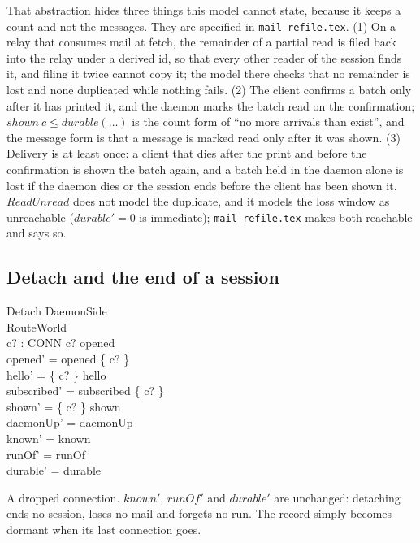 \documentclass[a4paper,10pt,fleqn]{article}
\begin{document}
That abstraction hides three things this model cannot state, because it keeps
a count and not the messages.  They are specified in \texttt{mail-refile.tex}.
(1) On a relay that consumes mail at fetch, the remainder of a partial read is
filed back into the relay under a derived id, so that every other reader of
the session finds it, and filing it twice cannot copy it; the model there
checks that no remainder is lost and none duplicated while nothing fails.
(2) The client confirms a batch only after it has printed it, and the daemon
marks the batch read on the confirmation; $shown~c \leq durable(\ldots)$ is
the count form of ``no more arrivals than exist'', and the message form is
that a message is marked read only after it was shown.  (3) Delivery is at
least once: a client that dies after the print and before the confirmation is
shown the batch again, and a batch held in the daemon alone is lost if the
daemon dies or the session ends before the client has been shown it.
$ReadUnread$ does not model the duplicate, and it models the loss window as
unreachable ($durable' = 0$ is immediate); \texttt{mail-refile.tex} makes both
reachable and says so.

\subsection{Detach and the end of a session}

\begin{schema}{Detach}
  \Delta DaemonSide \\
  \Xi RouteWorld \\
  c? : CONN
  \where
  c? \in opened \\
  opened' = opened \setminus \{ c? \} \\
  hello' = \{ c? \} \ndres hello \\
  subscribed' = subscribed \setminus \{ c? \} \\
  shown' = \{ c? \} \ndres shown \\
  daemonUp' = daemonUp \\
  known' = known \\
  runOf' = runOf \\
  durable' = durable
\end{schema}

A dropped connection.  $known'$, $runOf'$ and $durable'$ are unchanged:
detaching ends no session, loses no mail and forgets no run.  The record
simply becomes dormant when its last connection goes.
\end{document}
